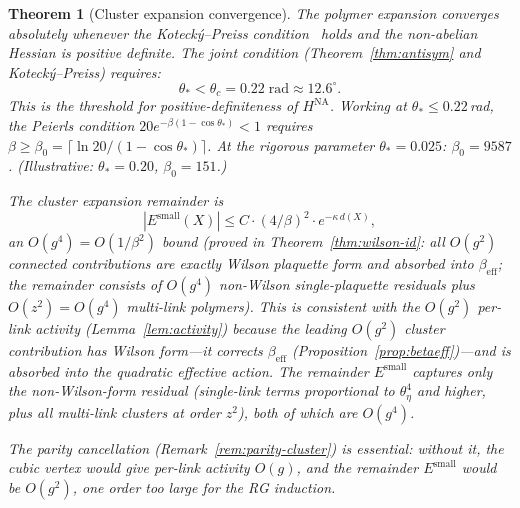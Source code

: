 \documentclass[11pt]{article}
\newtheorem{theorem}{Theorem}[section]
\theoremstyle{definition}
\begin{document}
\begin{theorem}[Cluster expansion convergence]\label{thm:cluster}
The polymer expansion converges absolutely whenever the
Koteck\'y--Preiss condition~\cite{KP} holds and the non-abelian
Hessian is positive definite.  The joint condition
(Theorem~\ref{thm:antisym} and Koteck\'y--Preiss) requires:
\begin{equation}
\theta_*<\theta_c=0.22\;\mathrm{rad}
\approx 12.6^\circ.
\end{equation}
This is the threshold for positive-definiteness of $H^{\mathrm{NA}}$.
Working at $\theta_*\le 0.22$\,rad,
the Peierls condition $20e^{-\beta(1-\cos\theta_*)}<1$
requires $\beta\ge\beta_0=\lceil\ln 20/(1-\cos\theta_*)\rceil$.
At the rigorous parameter $\theta_*=0.025$: $\beta_0=9587$.
(Illustrative: $\theta_*=0.20$, $\beta_0=151$.)

The cluster expansion remainder is
\begin{equation}\label{eq:remainder}
|E^{\mathrm{small}}(X)|\le C\cdot(4/\beta)^2\cdot e^{-\kappa\,d(X)},
\end{equation}
an $O(g^4)=O(1/\beta^2)$ bound
(proved in Theorem~\ref{thm:wilson-id}: all $O(g^2)$ connected
contributions are exactly Wilson plaquette form and absorbed
into $\beta_{\mathrm{eff}}$; the remainder consists of
$O(g^4)$ non-Wilson single-plaquette residuals plus
$O(z^2)=O(g^4)$ multi-link polymers).  This is consistent with the
$O(g^2)$ per-link activity (Lemma~\ref{lem:activity}) because the
leading $O(g^2)$ cluster contribution has Wilson form---it corrects
$\beta_{\mathrm{eff}}$
(Proposition~\ref{prop:betaeff})---and is \emph{absorbed} into the
quadratic effective action.  The remainder $E^{\mathrm{small}}$
captures only the non-Wilson-form residual (single-link terms
proportional to $\theta_\eta^4$ and higher, plus all multi-link
clusters at order $z^2$), both of which are $O(g^4)$.

The parity cancellation (Remark~\ref{rem:parity-cluster}) is
essential: without it, the cubic vertex would give per-link
activity $O(g)$, and the remainder $E^{\mathrm{small}}$ would
be $O(g^2)$, one order too large for the RG induction.
\end{theorem}
\end{document}
